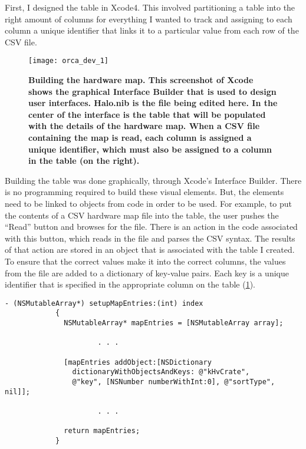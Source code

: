 		First, I designed the table in Xcode4. This involved partitioning a table into the right amount of columns for everything I wanted to track and assigning to each column a unique identifier that links it to a particular value from each row of the CSV file.

		\begin{figure}[H]
			\texttt{[image: orca\_dev\_1]}
			\caption[ORCA Development: Building the Hardware Map]{\bf Building the hardware map. \rm This screenshot of Xcode shows the graphical Interface Builder that is used to design user interfaces. Halo.nib is the file being edited here. In the center of the interface is the table that will be populated with the details of the hardware map. When a CSV file containing the map is read, each column is assigned a unique identifier, which must also be assigned to a column in the table (on the right).}
			\label{fig:orca_dev_1}
		\end{figure}
		\newpage
		Building the table was done graphically, through Xcode's Interface Builder. There is no programming required to build these visual elements. But, the elements need to be linked to objects from code in order to be used. For example, to put the contents of a CSV hardware map file into the table, the user pushes the ``Read'' button and browses for the file. There is an action in the code associated with this button, which reads in the file and parses the CSV syntax. The results of that action are stored in an object that is associated with the table I created. To ensure that the correct values make it into the correct columns, the values from the file are added to a dictionary of key-value pairs. Each key is a unique identifier that is specified in the appropriate column on the table (\FIG \ref{fig:orca_dev_1}).

		\lstset{language=object-c,
		gobble=23}
		\begin{lstlisting}[escapechar=$, caption={\it HaloModel.m. \rm \\ \linespread{1} \small Code required to assign values from CSV file to keys that can be displayed in the hardware map table. Only one entry of the list is shown, but the structure is the same for all of them.} ]
			- (NSMutableArray*) setupMapEntries:(int) index
			{
			  NSMutableArray* mapEntries = [NSMutableArray array];

	          		  . . .

			  [mapEntries addObject:[NSDictionary 
			    dictionaryWithObjectsAndKeys: @"kHvCrate", 
			    @"key", [NSNumber numberWithInt:0], @"sortType", nil]];

	        		  . . .

			  return mapEntries;
			}
		\end{lstlisting}

